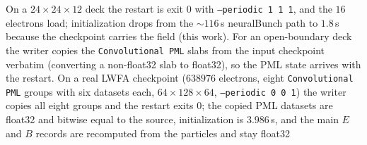  On a $24\times24\times12$ deck the restart is exit $0$ with
  \texttt{--periodic 1 1 1}, and the $16$ electrons load; initialization drops
  from the $\sim116$\,s neuralBunch path to $1.8$\,s because the checkpoint
  carries the field (this work). For an open-boundary deck the writer copies the
 \texttt{Convolutional PML} slabs from the input checkpoint verbatim
 (converting a non-float32 slab to float32), so the PML state arrives with the
 restart. On a real LWFA checkpoint ($638976$ electrons, eight
 \texttt{Convolutional PML} groups with six datasets each, $64\times128\times64$,
  \texttt{--periodic 0 0 1}) the writer copies all eight groups and the
  restart exits $0$; the copied PML datasets are float32 and bitwise equal to
  the source, initialization is $3.986$\,s, and the main $E$ and $B$ records are
  recomputed from the particles and stay float32
